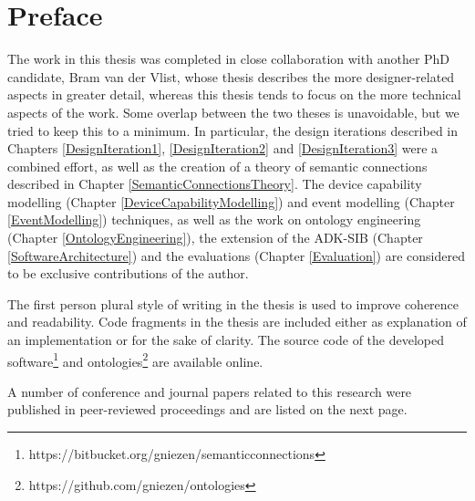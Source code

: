 \cleardoublepage
\pagestyle{empty}

\begingroup
\let\clearpage\relax
\let\cleardoublepage\relax
\let\cleardoublepage\relax

\chapter*{Preface}

The work in this thesis was completed in close collaboration with another PhD candidate, Bram van der Vlist, whose thesis \cite{Bram} describes the more designer-related aspects in greater detail, whereas this thesis tends to focus on the more technical aspects of the work. Some overlap between the two theses is unavoidable, but we tried to keep this to a minimum. In particular, the design iterations described in Chapters \ref{DesignIteration1}, \ref{DesignIteration2} and \ref{DesignIteration3} were a combined effort, as well as the creation of a theory of semantic connections described in Chapter \ref{SemanticConnectionsTheory}. The device capability modelling (Chapter \ref{DeviceCapabilityModelling}) and event modelling (Chapter \ref{EventModelling}) techniques, as well as the work on ontology engineering (Chapter \ref{OntologyEngineering}), the extension of the ADK-SIB (Chapter \ref{SoftwareArchitecture}) and the evaluations (Chapter \ref{Evaluation}) are considered to be exclusive contributions of the author. 

The first person plural style of writing in the thesis is used to improve coherence and readability. Code fragments in the thesis are included either as explanation of an implementation or for the sake of clarity. The source code of the developed software\footnote{https://bitbucket.org/gniezen/semanticconnections} and ontologies\footnote{https://github.com/gniezen/ontologies} are available online.

A number of conference and journal papers related to this research were published in peer-reviewed proceedings and are listed on the next page. 


\endgroup			

\vfill